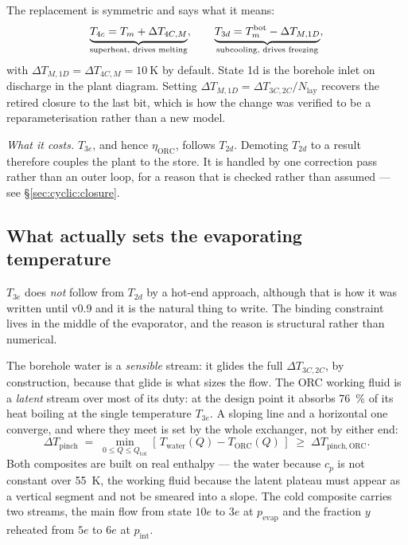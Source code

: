 The replacement is symmetric and says what it means:
\begin{equation}
  \underbrace{T_{4c}=T_{m}+\Delta T_{4C,M}}_{\text{superheat, drives melting}},
  \qquad
  \underbrace{T_{3d}=T_{m}^{\mathrm{bot}}-\Delta T_{M,1D}}
    _{\text{subcooling, drives freezing}},
  \label{eq:inlets}
\end{equation}
with $\Delta T_{M,1D}=\Delta T_{4C,M}=\SI{10}{\kelvin}$ by default. State 1d is
the borehole inlet on discharge in the plant diagram. Setting
$\Delta T_{M,1D}=\Delta T_{3C,2C}/N_{\mathrm{lay}}$ recovers the retired closure
to the last bit, which is how the change was verified to be a reparameterisation
rather than a new model.

\emph{What it costs.} $T_{3e}$, and hence $\eta_{\mathrm{ORC}}$, follows
$T_{2d}$. Demoting $T_{2d}$ to a result therefore couples the plant to the
store. It is handled by one correction pass rather than an outer loop, for a
reason that is checked rather than assumed --- see \S\ref{sec:cyclic:closure}.

\subsection{What actually sets the evaporating temperature}
\label{sec:cycles:pinch}

$T_{3e}$ does \emph{not} follow from $T_{2d}$ by a hot-end approach, although
that is how it was written until v0.9 and it is the natural thing to write. The
binding constraint lives in the middle of the evaporator, and the reason is
structural rather than numerical.

The borehole water is a \emph{sensible} stream: it glides the full
$\Delta T_{3C,2C}$, by construction, because that glide is what sizes the flow.
The ORC working fluid is a \emph{latent} stream over most of its duty: at the
design point it absorbs \SI{76}{\percent} of its heat boiling at the single
temperature $T_{3e}$. A sloping line and a horizontal one converge, and where
they meet is set by the whole exchanger, not by either end:
\begin{equation}
  \Delta T_{\mathrm{pinch}} \;=\;
  \min_{0 \le Q \le Q_{\mathrm{tot}}}
  \left[\,T_{\mathrm{water}}(Q) - T_{\mathrm{ORC}}(Q)\,\right]
  \;\ge\; \Delta T_{\mathrm{pinch,ORC}} .
  \label{eq:pinch}
\end{equation}
Both composites are built on real enthalpy --- the water because $c_{p}$ is not
constant over \SI{55}{\kelvin}, the working fluid because the latent plateau
must appear as a vertical segment and not be smeared into a slope. The cold
composite carries two streams, the main flow from state $10e$ to $3e$ at
$p_{\mathrm{evap}}$ and the fraction $y$ reheated from $5e$ to $6e$ at
$p_{\mathrm{int}}$.

